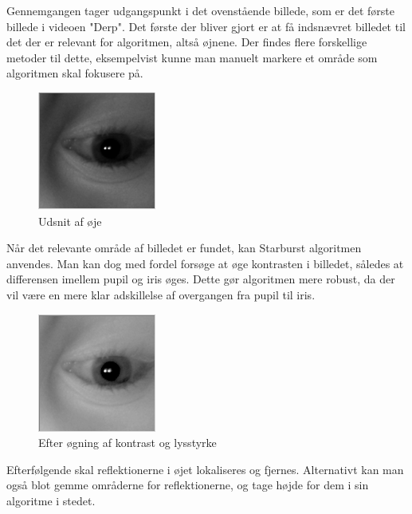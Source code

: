 \documentclass[rapport.tex]{subfiles}
\begin{document}
	Gennemgangen tager udgangspunkt i det ovenstående billede, som er det første billede i videoen "Derp". Det første der bliver gjort er at få indsnævret billedet til det der er relevant for algoritmen, altså øjnene. Der findes flere forskellige metoder til dette, eksempelvist kunne man manuelt markere et område som algoritmen skal fokusere på.
	
	\begin{figure}
	\centering
	\includegraphics[width=0.4\linewidth]{Billeder/CroppedEye.png}
	\caption{Udsnit af øje}
	\label{fig:CroppedEye}
	\end{figure}
	
	Når det relevante område af billedet er fundet, kan Starburst algoritmen anvendes. Man kan dog med fordel forsøge at øge kontrasten i billedet, således at differensen imellem pupil og iris øges. Dette gør algoritmen mere robust, da der vil være en mere klar adskillelse af overgangen fra pupil til iris.
	
	\begin{figure}
	\centering
	\includegraphics[width=0.4\linewidth]{Billeder/CroppedEye,PostBrightness.png}
	\caption{Efter øgning af kontrast og lysstyrke}
	\label{fig:CroppedEye,PostBrightness}
	\end{figure}
	
	Efterfølgende skal reflektionerne i øjet lokaliseres og fjernes. Alternativt kan man også blot gemme områderne for reflektionerne, og tage højde for dem i sin algoritme i stedet.
	
\end{document}
